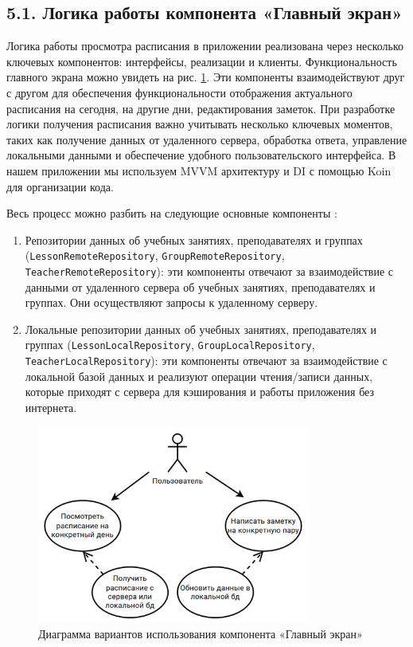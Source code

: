 \documentclass{vsureport}
\begin{document}
\subsection*{5.1. Логика работы компонента «Главный экран»}

Логика работы просмотра расписания в приложении реализована через несколько ключевых компонентов: интерфейсы, реализации и клиенты. Функциональность главного экрана можно увидеть на рис. \ref{fig:fig11}.
Эти компоненты взаимодействуют друг с другом для обеспечения функциональности отображения актуального расписания на сегодня, на другие дни, редактирования заметок. При разработке логики получения расписания важно учитывать несколько ключевых моментов, таких как получение данных от удаленного сервера, обработка ответа, управление локальными данными и обеспечение удобного пользовательского интерфейса. В нашем приложении мы используем MVVM архитектуру и DI с помощью Koin для организации кода.

Весь процесс можно разбить на следующие основные компоненты \cite{ref10}: 
\begin{enumerate}
    \item Репозитории данных об учебных занятиях, преподавателях и группах (\texttt{LessonRemoteRepository}, \texttt{GroupRemoteRepository}, \\  \texttt{TeacherRemoteRepository}): эти компоненты отвечают за взаимодействие с данными от удаленного сервера об учебных занятиях, преподавателях и группах. Они осуществляют запросы к удаленному серверу. 
    \item Локальные репозитории данных об учебных занятиях, преподавателях и группах (\texttt{LessonLocalRepository}, \texttt{GroupLocalRepository}, \\  \texttt{TeacherLocalRepository}): эти компоненты отвечают за взаимодействие с локальной базой данных и реализуют операции чтения/записи данных, которые приходят с сервера для кэширования и работы приложения без интернета.
\end{enumerate}

\begin{figure}[H]
    \centering
    \includegraphics[width=0.8\textwidth]{11.png}
    \caption{Диаграмма вариантов использования компонента «Главный экран»}
    \label{fig:fig11}
\end{figure}
\end{document}
